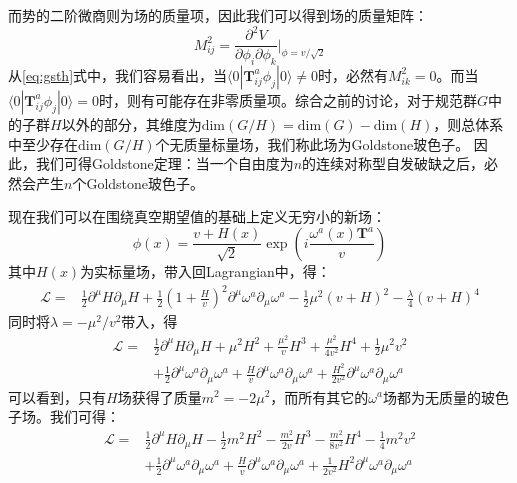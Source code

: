 而势的二阶微商则为场的质量项，因此我们可以得到场的质量矩阵：
\begin{equation}
    M^2_{ij}=\frac{\partial^2 V}{\partial \phi_i\partial\phi_k}\Big|_{\phi = v/\sqrt{2}}
\end{equation}
从\eqref{eq:gsth}式中，我们容易看出，当$\langle0|\boldsymbol{T}^a_{ij} \phi_j|0\rangle\neq0$时，必然有$M^2_{ik}=0$。而当$\langle0|\boldsymbol{T}^a_{ij} \phi_j|0\rangle=0$时，则有可能存在非零质量项。综合之前的讨论，对于规范群$G$中的子群$H$以外的部分，其维度为$\mathrm{dim}(G/H)=\mathrm{dim}(G)-\mathrm{dim}(H)$，则总体系中至少存在$\mathrm{dim}(G/H)$个无质量标量场，我们称此场为Goldstone玻色子。%
因此，我们可得Goldstone定理：当一个自由度为$n$的连续对称型自发破缺之后，必然会产生$n$个Goldstone玻色子。

现在我们可以在围绕真空期望值的基础上定义无穷小的新场：
\begin{equation}
    \phi(x)=\frac{v+ H(x)}{\sqrt{2}}\exp\left(i\frac{\omega^a(x)\boldsymbol{T}^a}{v}\right)
    \label{eq:phiv}
\end{equation}
其中$H(x)$为实标量场，带入回Lagrangian中，得：
\begin{align}
    \mathscr{L}=&\frac{1}{2}\partial^\mu H\partial_\mu H+\frac{1}{2}\left(1+\frac{H}{v}\right)^2\partial^\mu\omega^a\partial_\mu\omega^a-\frac{1}{2}\mu^2(v+ H)^2-\frac{\lambda}{4}(v+ H)^4%
\end{align}
同时将$\lambda=-\mu^2/v^2$带入，得
\begin{equation}
\begin{split}
    \mathscr{L}=&\frac{1}{2}\partial^\mu H\partial_\mu H+\mu^2 H^2  +\frac{\mu^2}{v} H^3+\frac{\mu^2}{4v^2} H^4+\frac{1}{2}\mu^2 v^2\\
    &+ \frac{1}{2} \partial^\mu\omega^a\partial_\mu\omega^a +\frac{H}{v} \partial^\mu\omega^a\partial_\mu\omega^a + \frac{H^2}{2v^2}\partial^\mu\omega^a\partial_\mu\omega^a
\end{split}
\end{equation}
可以看到，只有$ H$场获得了质量$m^2=-2\mu^2$，而所有其它的$\omega^a$场都为无质量的玻色子场。我们可得：
\begin{equation}
\begin{split}
    \mathscr{L}=&\frac{1}{2}\partial^\mu H\partial_\mu H-\frac{1}{2}m^2 H^2  -\frac{m^2}{2v} H^3-\frac{m^2}{8v^2} H^4-\frac{1}{4}m^2 v^2\\
    &+ \frac{1}{2} \partial^\mu\omega^a\partial_\mu\omega^a +\frac{H}{v} \partial^\mu\omega^a\partial_\mu\omega^a + \frac{1}{2v^2}H^2\partial^\mu\omega^a\partial_\mu\omega^a
\end{split}
\end{equation}


